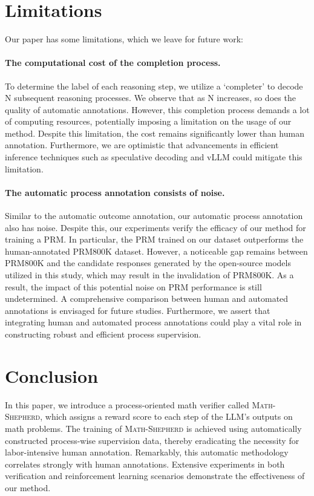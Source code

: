 \documentclass{article} %
\newcommand{\methodname}{\textsc{Math-Shepherd}\xspace}
\begin{document}
\section{Limitations}
Our paper has some limitations, which we leave for future work:

\paragraph{The computational cost of the completion process.} To determine the label of each reasoning step, we utilize a `completer' to decode N subsequent reasoning processes. We observe that as N increases, so does the quality of automatic annotations. However, this completion process demands a lot of computing resources, potentially imposing a limitation on the usage of our method. Despite this limitation, the cost remains significantly lower than human annotation. 
Furthermore, we are optimistic that advancements in efficient inference techniques such as speculative decoding \citep{xia2022lossless,leviathan2023fast} and vLLM \citep{kwon2023efficient} could mitigate this limitation.

\paragraph{The automatic process annotation consists of noise.} Similar to the automatic outcome annotation,  our automatic process annotation also has noise.
Despite this, our experiments verify the efficacy of our method for training a PRM. In particular, the PRM trained on our dataset outperforms the human-annotated PRM800K dataset. 
However, a noticeable gap remains between PRM800K and the candidate responses generated by the open-source models utilized in this study, which may result in the invalidation of PRM800K. 
As a result, the impact of this potential noise on PRM performance is still undetermined. A comprehensive comparison between human and automated annotations is envisaged for future studies. Furthermore, we assert that integrating human and automated process annotations could play a vital role in constructing robust and efficient process supervision.



\section{Conclusion}
 In this paper, we introduce a process-oriented math verifier called \methodname, which assigns a reward score to each step of the LLM's outputs on math problems. The training of \methodname is achieved using automatically constructed process-wise supervision data, thereby eradicating the necessity for labor-intensive human annotation. Remarkably, this automatic methodology correlates strongly with human annotations. Extensive experiments in both verification and reinforcement learning scenarios demonstrate the effectiveness of our method.



\end{document}
